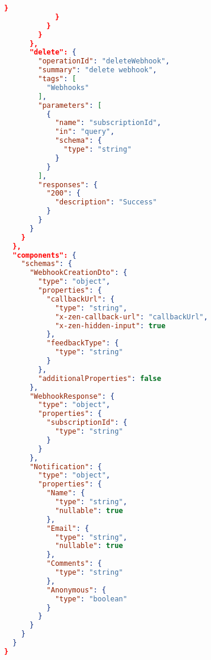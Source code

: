\begin{lstlisting}[language=json,basicstyle=\ttfamily\tiny,numberstyle=\tiny]
              }
            }
          }
        }
      },
      "delete": {
        "operationId": "deleteWebhook",
        "summary": "delete webhook",
        "tags": [
          "Webhooks"
        ],
        "parameters": [
          {
            "name": "subscriptionId",
            "in": "query",
            "schema": {
              "type": "string"
            }
          }
        ],
        "responses": {
          "200": {
            "description": "Success"
          }
        }
      }
    }
  },
  "components": {
    "schemas": {
      "WebhookCreationDto": {
        "type": "object",
        "properties": {
          "callbackUrl": {
            "type": "string",
            "x-zen-callback-url": "callbackUrl",
            "x-zen-hidden-input": true 
          },
          "feedbackType": {
            "type": "string"
          }
        },
        "additionalProperties": false
      },
      "WebhookResponse": {
        "type": "object",
        "properties": {
          "subscriptionId": {
            "type": "string"
          }
        }
      },
      "Notification": {
        "type": "object",
        "properties": {
          "Name": {
            "type": "string",
            "nullable": true
          },
          "Email": {
            "type": "string",
            "nullable": true
          },
          "Comments": {
            "type": "string"
          },
          "Anonymous": {
            "type": "boolean"
          }
        }
      }
    }
  }
}
\end{lstlisting}
